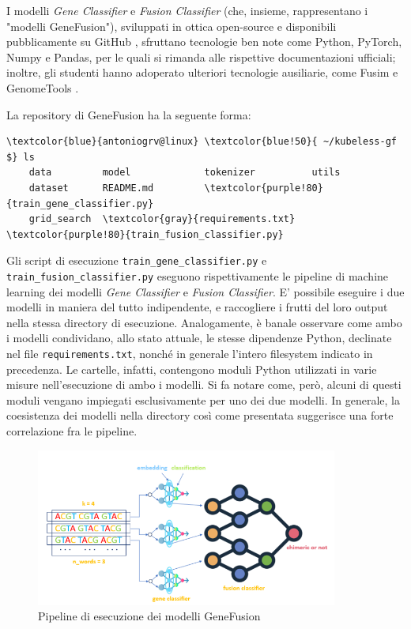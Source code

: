 I modelli {\em Gene Classifier} e {\em Fusion Classifier} (che, insieme, rappresentano i "modelli GeneFusion"), sviluppati in ottica open-source e disponibili pubblicamente su GitHub \cite{kubeless_gf}, sfruttano tecnologie ben note come Python, PyTorch, Numpy e Pandas, per le quali si rimanda alle rispettive documentazioni ufficiali; inoltre, gli studenti hanno adoperato ulteriori tecnologie ausiliarie, come Fusim \cite{fusim} e GenomeTools \cite{gt}.

La repository di GeneFusion ha la seguente forma:

\begin{small}
\begin{Verbatim}[commandchars=\\\{\}]
    \textcolor{blue}{antoniogrv@linux} \textcolor{blue!50}{ ~/kubeless-gf $} ls
    data         model             tokenizer          utils
    dataset      README.md         \textcolor{purple!80}{train_gene_classifier.py}
    grid_search  \textcolor{gray}{requirements.txt}  \textcolor{purple!80}{train_fusion_classifier.py}
\end{Verbatim}
\end{small}

Gli script di esecuzione {\small {\color{purple!80} \verb|train_gene_classifier.py|}} e {\small {\color{purple!80} \verb|train_fusion_classifier.py|}} eseguono rispettivamente le pipeline di machine learning dei modelli {\em Gene Classifier} e {\em Fusion Classifier}. E' possibile eseguire i due modelli in maniera del tutto indipendente, e raccogliere i frutti del loro output nella stessa directory di esecuzione. Analogamente, è banale osservare come ambo i modelli condividano, allo stato attuale, le stesse dipendenze Python, declinate nel file {\small {\color{gray} \verb|requirements.txt|}}, nonché in generale l'intero filesystem indicato in precedenza. Le cartelle, infatti, contengono moduli Python utilizzati in varie misure nell'esecuzione di ambo i modelli. Si fa notare come, però, alcuni di questi moduli vengano impiegati esclusivamente per uno dei due modelli. In generale, la coesistenza dei modelli nella directory così come presentata suggerisce una forte correlazione fra le pipeline.

\begin{figure}[h]
    \centering
    \includegraphics[width=375px]{figures/ch2/genefusion.png}
    \caption[Pipeline di esecuzione dei modelli GeneFusion]{Pipeline di esecuzione dei modelli GeneFusion}
    \label{fig:cha2:gf}
\end{figure}

